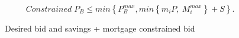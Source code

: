 \begin{equation}
    Constrained\; P_{B} \le min \left\{P^{max}_B, min\left\{m_i P,\  M_{i}^{max}\right\}+ S \right\}.  \label{eqn:bid_diagonal}
\end{equation}




 \begin{figure}
    \centering
    
    \caption{Desired bid  and savings + mortgage constrained bid}
    \label{fig:savings-constraint}
    \end{figure}

%



        

